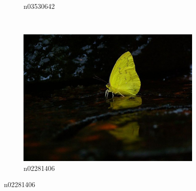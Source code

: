 \documentclass[11pt, a4paper]{article}
\begin{document}
\begin{figure}[h!tb]
\begin{subfigure}[b]{0.30\textwidth}
        \caption{n03530642}
        \label{fig:imagenet-examples-2}
    \end{subfigure}
    ~ %
    \begin{subfigure}[b]{0.30\textwidth}
    		\centering
        \includegraphics[width=\textwidth]{imagenet/examples/n02281406_10006.JPEG}
        \caption{n02281406}
        \label{fig:imagenet-examples-3}
    \end{subfigure}
    

\end{figure}
\end{document}
